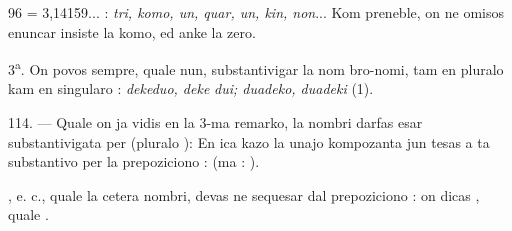 \begin{VUpage}[100]{96}
= 3,14159... : \textit{tri, komo, un, quar, un, kin, non}... Kom\cc
preneble, on ne omisos enuncar insiste la komo, ed anke\nl
la zero.

3\textsuperscript{a}. On povos sempre, quale nun, substantivigar la nom\cc
bro-nomi, tam en pluralo kam en singularo : \textit{dekeduo, deke}\cc
\textit{dui; duadeko, duadeki} (1).

\VUblanc{4.82pt}%
114. --- Quale on ja vidis en la 3-ma remarko, la nombri\nl
darfas esar substantivigata per  (pluralo ): \nl
{} En ica kazo la unajo kompozanta jun\cc
tesas a ta substantivo per la prepoziciono  : \nl
{} (ma : ).

, e. c., quale la cetera nombri, devas\nl
ne sequesar dal prepoziciono  : on dicas \nl
{}, quale .
\end{VUpage}

